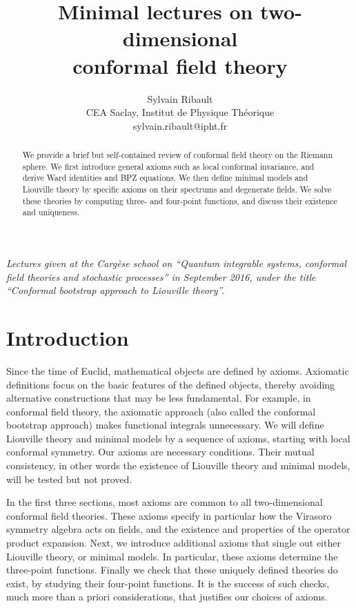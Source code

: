 \documentclass[12pt, a4paper]{article}
\title{\bfseries Minimal lectures on two-dimensional \\ conformal field theory}
\author{Sylvain Ribault \vspace{2mm}
\\
{\normalsize CEA Saclay, Institut de Physique Th\'eorique}
 \\
 {\footnotesize \ttfamily sylvain.ribault@ipht.fr }
}
\theoremstyle{break}
\begin{document}
\maketitle


\begin{abstract}
We provide a brief but self-contained review of conformal field theory on the Riemann sphere. We first introduce general axioms such as local conformal invariance, and derive Ward identities and BPZ equations. We then define minimal models and  Liouville theory by specific axioms on their spectrums and degenerate fields. We solve these theories by computing 
three- and four-point functions, and discuss their existence and uniqueness. 
\end{abstract}

\vspace{5mm}

 \noindent\textit{Lectures given at the Carg\`ese school on ``Quantum integrable systems, conformal field theories and stochastic processes'' in September 2016, under the title ``Conformal bootstrap approach to Liouville theory''.}



\clearpage

\tableofcontents

\hypersetup{linkcolor=blue}

\setcounter{section}{-1}

\section{Introduction}

Since the time of Euclid, mathematical objects are defined by axioms. 
Axiomatic definitions focus on the basic features of the defined objects, thereby avoiding alternative constructions that may be less fundamental.
For example, in conformal field theory, the axiomatic approach (also called the conformal bootstrap approach) makes functional integrals unnecessary.
We will define Liouville theory and minimal models by a sequence of axioms, starting with local conformal symmetry. 
Our axioms are necessary conditions. 
Their mutual consistency, in other words the existence of Liouville theory and minimal models, will be tested but not proved.

In the first three sections, most axioms are common to all two-dimensional conformal field theories.
These axioms specify in particular how the Virasoro symmetry algebra acts on fields, and the existence and properties of the operator product expansion. 
Next, we introduce additional axioms that single out either Liouville theory, or minimal models.
In particular, these axioms determine the three-point functions. 
Finally we check that these uniquely defined theories do exist, by studying their four-point functions.
It is the success of such checks, much more than a priori considerations, that justifies our choices of axioms. 
\end{document}
